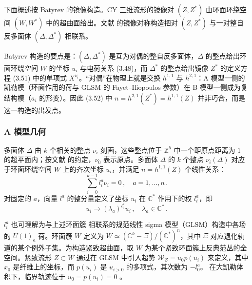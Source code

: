下面概述按 Batyrev 的镜像构造。CY 三维流形的镜像对 $(Z,Z^*)$ 由环面环绕空间 $(W,W^*)$ 中的超曲面给出。文献 \cite{ref65} 的镜像对称构造把对 $(Z,Z^*)$ 与一对整自反多面体 $(\Delta,\Delta^*)$ 相联系。

\begin{yizhu}[物理图像]
Batyrev 构造的要点是：$(\Delta,\Delta^*)$ 是互为对偶的整自反多面体，$\Delta$ 的整点给出环面环绕空间 $W$ 的坐标 $u_i$ 与电荷关系 (3.48)，而 $\Delta^*$ 的整点给出镜像 $Z^*$ 的定义方程 (3.51) 中的单项式 $X^{\nu_i}$。“对偶”在物理上就是交换 $h^{1,1}$ 与 $h^{2,1}$：A 模型一侧的凯勒模（环面作用的荷与 GLSM 的 Fayet--Iliopoulos 参数）在 B 模型一侧成为复结构模（$a_i$ 的形变）。因此 (3.52) 中 $n=h^{2,1}(Z^*)=h^{1,1}(Z)$ 并非巧合，而是这一构造的出发点。
\end{yizhu}


\subsubsection{A 模型几何}
\label{sec:3.6.1}

多面体 $\Delta$ 由 $k$ 个相关的整点 $\nu_i$ 刻画，这些整点位于 $\mathbb{Z}^5$ 中一个距原点距离为 $1$ 的超平面内；按文献 \cite{ref65,ref66} 的约定，$\nu_0$ 表示原点。多面体 $\Delta$ 的 $k$ 个整点 $\nu_i(\Delta)$ 对应于环面环绕空间 $W$ 上的齐次坐标 $u_i$，并满足 $n=h^{1,1}(Z)$ 个线性关系：
\begin{equation}\tag{3.48}
\sum_{i=0}^{k-1}l_i^a\nu_i=0\,,\quad a=1,\dots,n\,.
\end{equation}
对固定的 $a$，向量 $l^a$ 的整分量定义了坐标 $u_i$ 在 $\mathbb{C}^*$ 作用下的权 $l_i^a$，即
\[
u_i\to(\lambda_a)^{l_i^a}u_i\,,\quad \lambda_a\in\mathbb{C}^*\,.
\]

$l_i^a$ 也可理解为与上述环面簇 \cite{ref42} 相联系的规范线性 sigma 模型（GLSM）构造中各场的 $U(1)_a$ 荷。环面簇 $W$ 定义为 $W\simeq(\mathbb{C}^k-\Xi)/(\mathbb{C}^*)^n$，其中 $\Xi$ 对应退化轨道的某个例外子集。为构造紧致超曲面，取 $W$ 为某个紧致环面簇上反典范丛的全空间。紧致流形 $Z\subset W$ 通过在 GLSM 中引入超势 $\mathcal{W}_Z=u_0p(u_i)$ 来定义，其中 $x_0$ 是纤维上的坐标，而 $p(u_i)$ 是 $u_{i>0}$ 的多项式，其次数为 $-l_0^a$。
在大凯勒体积下，临界轨迹位于 $u_0=p(u_i)=0$ \cite{ref42}。

